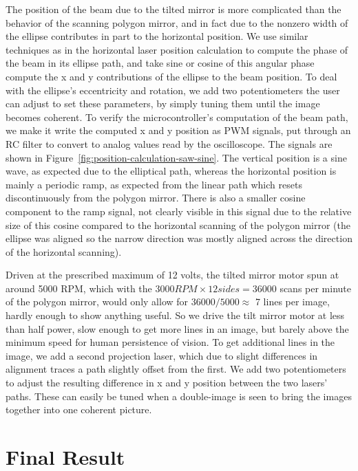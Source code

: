\documentclass[twocolumn]{revtex4-2}
\begin{document}
The position of the beam due to the tilted mirror is more complicated than the behavior of the scanning polygon mirror, and in fact due to the nonzero width of the ellipse contributes in part to the horizontal position. We use similar techniques as in the horizontal laser position calculation to compute the phase of the beam in its ellipse path, and take sine or cosine of this angular phase compute the x and y contributions of the ellipse to the beam position. To deal with the ellipse's eccentricity and rotation, we add two potentiometers the user can adjust to set these parameters, by simply tuning them until the image becomes coherent. To verify the microcontroller's computation of the beam path, we make it write the computed x and y position as PWM signals, put through an RC filter to convert to analog values read by the oscilloscope. The signals are shown in Figure~\ref{fig:position-calculation-saw-sine}. The vertical position is a sine wave, as expected due to the elliptical path, whereas the horizontal position is mainly a periodic ramp, as expected from the linear path which resets discontinuously from the polygon mirror. There is also a smaller cosine component to the ramp signal, not clearly visible in this signal due to the relative size of this cosine compared to the horizontal scanning of the polygon mirror (the ellipse was aligned so the narrow direction was mostly aligned across the direction of the horizontal scanning).

Driven at the prescribed maximum of 12 volts, the tilted mirror motor spun at around 5000 RPM, which with the $3000 RPM \times 12 sides = 36000$ scans per minute of the polygon mirror, would only allow for $36000/5000 \approx$ 7 lines per image, hardly enough to show anything useful. So we drive the tilt mirror motor at less than half power, slow enough to get more lines in an image, but barely above the minimum speed for human persistence of vision. To get additional lines in the image, we add a second projection laser, which due to slight differences in alignment traces a path slightly offset from the first. We add two potentiometers to adjust the resulting difference in x and y position between the two lasers' paths. These can easily be tuned when a double-image is seen to bring the images together into one coherent picture.



\section{Final Result}
\end{document}
